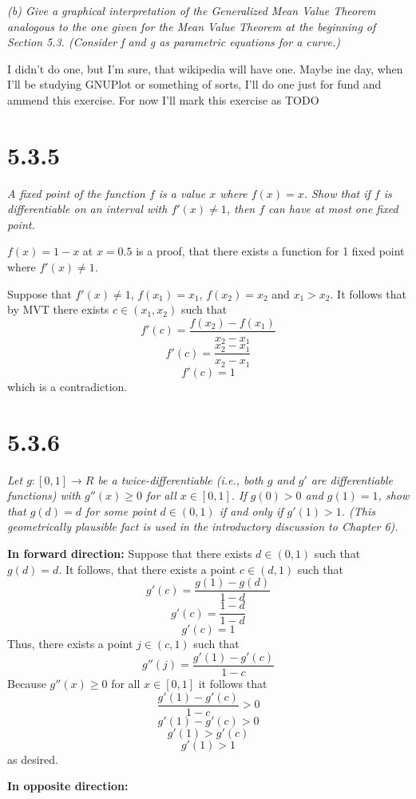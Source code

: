\documentclass[11pt,oneside,titlepage]{book}
\begin{document}
\textit{(b) Give a graphical interpretation of the Generalized Mean
  Value Theorem analogous to the one given for the Mean Value Theorem at
  the beginning of Section 5.3. (Consider f and g as parametric equations
  for a curve.)}

I didn't do one, but I'm sure, that wikipedia will have one. Maybe ine day,
when I'll be studying GNUPlot or something of sorts, I'll do one just for
fund and ammend this exercise. For now I'll mark this exercise as TODO

\section*{5.3.5}
\textit{ A fixed point of the function $f$ is a value $x$ where $f(x) = x$.
  Show that if $f$ is differentiable on an interval with $f'(x) \neq 1$, then
  $f$ can have at most one fixed point.}

$f(x) = 1 - x$ at $x = 0.5$ is a proof, that there exists a function for
1 fixed point where $f'(x) \neq 1$.

Suppose that $f'(x) \neq 1$, $f(x_1) = x_1$, $f(x_2) = x_2$ and $x_1 > x_2$.
It follows that by MVT there exists $c \in (x_1, x_2)$ such that
$$f'(c) = \frac{f(x_2) - f(x_1)}{x_2 - x_1}$$
$$f'(c) = \frac{x_2 - x_1}{x_2 - x_1}$$
$$f'(c) = 1$$
which is a contradiction.

\section*{5.3.6}
\textit{Let $g: [0, 1] \to R$ be a twice-differentiable (i.e., both $g$ and
  $g'$ are differentiable functions) with $g''(x) \geq 0$ for all
  $x \in [0, 1]$. If $g(0) > 0$ and $g(1) = 1$, show that $g(d) = d$ for some
  point $d \in (0, 1)$ if and only if $g'(1) > 1$. (This geometrically
  plausible fact is used in the introductory discussion to Chapter 6).}

\textbf{In forward direction: }
Suppose that there exists $d \in (0, 1)$ such that $g(d) = d$. It follows, that
there exists a point $c \in (d, 1)$ such that
$$g'(c) = \frac{g(1) - g(d)}{1 - d}$$
$$g'(c) = \frac{1 - d}{1 - d}$$
$$g'(c) = 1$$
Thus, there exists a point  $j \in (c, 1)$ such that
$$g''(j) = \frac{g'(1) - g'(c)}{1 - c}$$
Because $g''(x) \geq 0$ for all $x \in [0, 1]$ it follows that
$$\frac{g'(1) - g'(c)}{1 - c} > 0$$
$$g'(1) - g'(c) > 0$$
$$g'(1) > g'(c)$$
$$g'(1) > 1$$
as desired.

\textbf{In opposite direction: }
\end{document}
